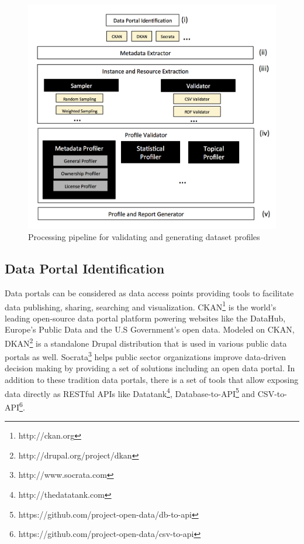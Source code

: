 \documentclass[runningheads,a4paper]{llncs}
\begin{document}
\begin{figure}[h!]
  \centering
    \includegraphics[scale=0.4]{figure-1_architecture.png}
  \caption{Processing pipeline for validating and generating dataset profiles}
\end{figure}

\subsection{Data Portal Identification}

Data portals can be considered as data access points providing tools to facilitate data publishing, sharing, searching and visualization. CKAN\footnote{http://ckan.org} is the world's leading open-source data portal platform powering websites like the DataHub, Europe's Public Data and the U.S Government's open data. Modeled on CKAN, DKAN\footnote{http://drupal.org/project/dkan} is a standalone Drupal distribution that is used in various public data portals as well. Socrata\footnote{http://www.socrata.com} helps public sector organizations improve data-driven decision making by providing a set of solutions including an open data portal. In addition to these tradition data portals, there is a set of tools that allow exposing data directly as RESTful APIs like Datatank\footnote{http://thedatatank.com}, Database-to-API\footnote{https://github.com/project-open-data/db-to-api} and CSV-to-API\footnote{https://github.com/project-open-data/csv-to-api}.\\
\end{document}
